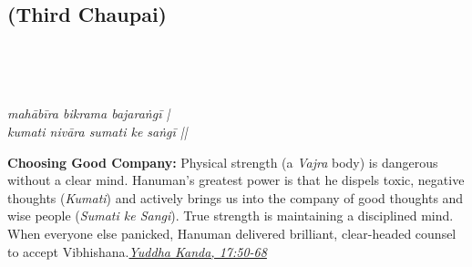 
\newpage

\subsection*{ (Third Chaupai)}

\begin{minipage}[t]{0.55\textwidth}
\vspace{0pt}

{\large \linespread{1.5}\selectfont
{}\\
\par}

\vspace{0.5em}

{\large \linespread{1.5}\selectfont
{}\\
\par}

\vspace{0.5em}

{\large \linespread{1.3}\selectfont
\textit{mahābīra bikrama bajaraṅgī |}\\
\textit{kumati nivāra sumati ke saṅgī ||}
\par}
\end{minipage}%
\hfill
\begin{minipage}[t]{0.42\textwidth}
\vspace{0pt}
\begin{tcolorbox}[anchorbox]
\textbf{Choosing Good Company:} Physical strength (a \textit{Vajra} body) is dangerous without a clear mind. Hanuman's greatest power is that he dispels toxic, negative thoughts (\textit{Kumati}) and actively brings us into the company of good thoughts and wise people (\textit{Sumati ke Sangi}). True strength is maintaining a disciplined mind.
\vspace{0.5em}\newline When everyone else panicked, Hanuman delivered brilliant, clear-headed counsel to accept Vibhishana.\newline\null\hfill\href{https://www.valmiki.iitk.ac.in/sloka?field_kanda_tid=6&language=dv&field_sarga_value=17}{\textit{Yuddha Kanda, 17:50-68}}
\end{tcolorbox}
\end{minipage}

